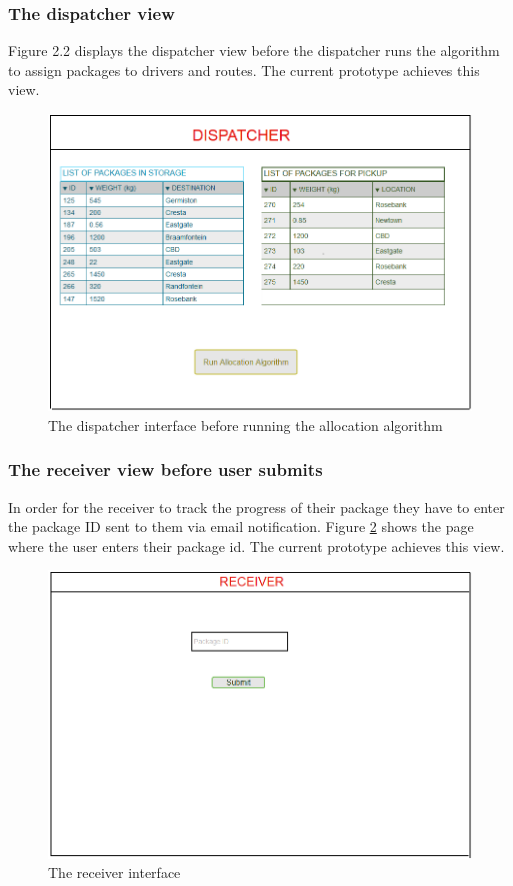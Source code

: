 \documentclass[paper=a4, fontsize=11pt]{scrartcl} %
\numberwithin{equation}{section} %
\numberwithin{figure}{section} %
\numberwithin{table}{section} %
\begin{document}
\subsubsection{The dispatcher view}
Figure 2.2 displays the dispatcher view before the dispatcher runs the algorithm to assign packages to drivers and routes. The current prototype achieves this view.
\begin{figure}[hbt!]
\centering
\includegraphics[width=5in]{dispatcherBefore.png}
\caption{The dispatcher interface before running the allocation algorithm}
\label{DispatcherBefore}
\end{figure}




\subsubsection{The receiver view before user submits}
In order for the receiver to track the progress of their package they have to enter the package ID sent to them via email notification. Figure \ref{ReceiverBefore} shows the page where the user enters their package id. The current prototype achieves this view.
\begin{figure}[hbt!]
\centering
\includegraphics[width=5in]{receiverBefore.png}
\caption{The receiver interface}
\label{ReceiverBefore}
\end{figure}
\end{document}
